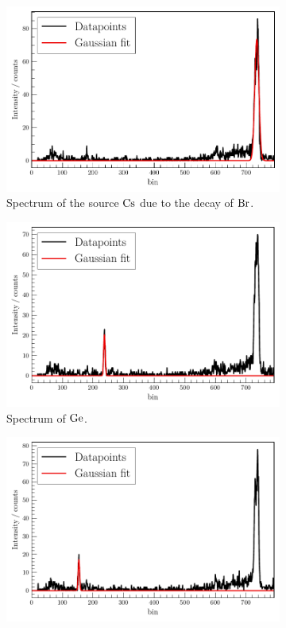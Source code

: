 \begin{figure}
    \centering
\begin{subfigure}{.3\textwidth}
    \centering
    \includegraphics[width=\textwidth]{plots/source-spectrum.pdf}
    \caption{Spectrum of the source $\ce{Cs}$ due to the decay of $\ce{Br}$. }
\end{subfigure}
\begin{subfigure}{.3\textwidth}
    \centering
    \includegraphics[width=\textwidth]{plots/GE-spectrum.pdf}
    \caption{Spectrum of $\ce{Ge}$.}
\end{subfigure}
\begin{subfigure}{.3\textwidth}
    \centering
    \includegraphics[width=\textwidth]{plots/FE-spectrum.pdf}

\end{subfigure}
\end{figure}
